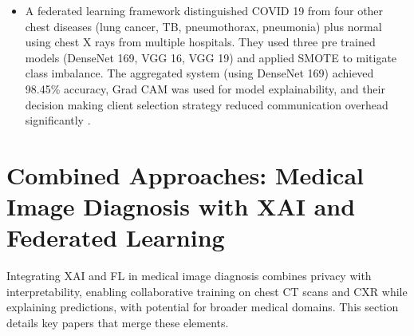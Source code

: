 \begin{itemize}
	\item A federated learning framework distinguished COVID 19 from four other chest diseases (lung cancer, TB, pneumothorax, pneumonia) plus normal using chest X rays from multiple hospitals. They used three pre trained models (DenseNet 169, VGG 16, VGG 19) and applied SMOTE to mitigate class imbalance. The aggregated system (using DenseNet 169) achieved 98.45\% accuracy, Grad CAM was used for model explainability, and their decision making client selection strategy reduced communication overhead significantly \cite{ref35}.
\end{itemize}

\section[Combined Approaches]{Combined Approaches: Medical Image Diagnosis with XAI and Federated Learning}

Integrating XAI and FL in medical image diagnosis combines privacy with interpretability, enabling collaborative training on chest CT scans and CXR while explaining predictions, with potential for broader medical domains. This section details key papers that merge these elements.

